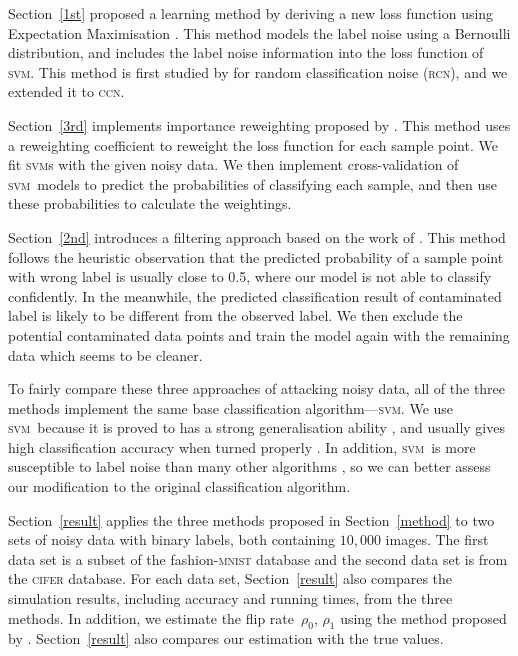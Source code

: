 \documentclass[12pt]{article} %
\newcommand{\svm}{\textsc{svm}}
\begin{document}
Section~\ref{1st} proposed a learning method by deriving a new loss function using Expectation Maximisation \citep[p.423]{Bishop:2006:PRM:1162264}. This method models the label noise using a Bernoulli distribution, and includes the label noise information into the loss function of \svm. This method is first studied by \citet{pmlr-v20-biggio11} for random classification noise (\textsc{rcn}), and we extended it to \textsc{ccn}. 

Section~\ref{3rd} implements importance reweighting proposed by \citet{liu2016classification}. This method uses a reweighting coefficient to reweight the loss function for each sample point. We fit \svm s with the given noisy data. We then implement cross-validation of \svm\ models to predict the probabilities of classifying each sample, and then use these probabilities to calculate the weightings.

Section~\ref{2nd} introduces a filtering approach based on the work of \citet{brodley1996identifying}. This method follows the heuristic observation that the predicted probability of a sample point with wrong label is usually close to 0.5, where our model is not able to classify confidently. In the meanwhile, the predicted classification result of contaminated label is likely to be different from the observed label.  We then exclude the potential contaminated data points and train the model again with the remaining data which seems to be cleaner. 

To fairly compare these three approaches of attacking noisy data, all of the three methods implement the same base classification algorithm---\svm. We use \svm\ because it is proved to has a strong generalisation ability \citep{NIPS2012_4500,Seeger:2003:PGE:944919.944929,Cortes1995}, and usually gives high classification accuracy when turned properly \citep{Fernandez-Delgado:2014:WNH:2627435.2697065}. In addition, \svm\ is more susceptible to label noise than many other algorithms \citep{frenay2014classification}, so we can better assess our modification to the original classification algorithm.

Section~\ref{result} applies the three methods proposed in Section~\ref{method} to two sets of noisy data with binary labels, both containing $10,000$ images. The first data set is a subset of the fashion-\textsc{mnist} database and the second data set is from the \textsc{cifer} database. For each data set, Section~\ref{result} also compares the simulation results, including accuracy and running times, from the three methods. In addition, we estimate the flip rate~$\rho_0$, $\rho_1$ using the method proposed by \citet{liu2016classification}. 
Section~\ref{result} also compares our estimation with the true values.
\end{document}
